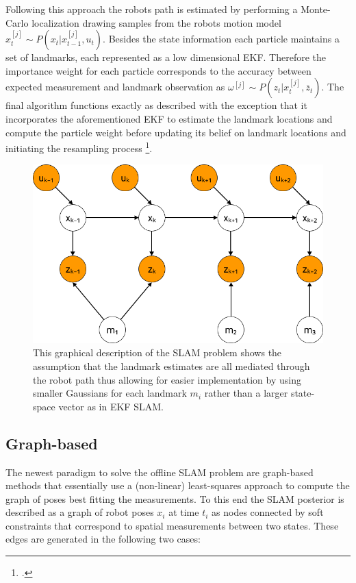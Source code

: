 Following this approach the robots path is estimated by performing a Monte-Carlo localization drawing samples from the robots motion model $x_{t}^{[j]} \sim P(x_{t} | x_{t-1}^{[j]}, u_{t}) $. Besides the state information each particle maintains a set of landmarks, each represented as a low dimensional EKF. Therefore the importance weight for each particle corresponds to the accuracy between expected measurement and landmark observation as $ \omega^{[j]} \sim P(z_{t} | x_{t}^{[j]}, \overline{z}_{t}) $.
The final algorithm functions exactly as described with the exception that it incorporates the aforementioned EKF to estimate the landmark locations and compute the particle weight before updating its belief on landmark locations and initiating the resampling process \footcite[Pages 1159-1162]{stachniss2016simultaneous}. 


\begin{figure}
	\centering
	\includegraphics[width=0.5\linewidth]{img/FastSlamGraphical}
	\caption{
		This graphical description of the SLAM problem shows the assumption that the landmark estimates are all mediated through the robot path thus allowing for easier implementation by using smaller Gaussians for each landmark $m_{i}$ rather than a larger state-space vector as in EKF SLAM.
	}
	\label{fig:fastSlamGraphical}
\end{figure}

\subsection{Graph-based}
The newest paradigm to solve the offline SLAM problem are graph-based methods that essentially use a (non-linear) least-squares approach to compute the graph of poses best fitting the measurements. 
To this end the SLAM posterior is described as a graph of robot poses $ x_{i} $ at time $ t_{i} $ as nodes connected by soft constraints that correspond to spatial measurements between two states.
These edges are generated in the following two cases:


